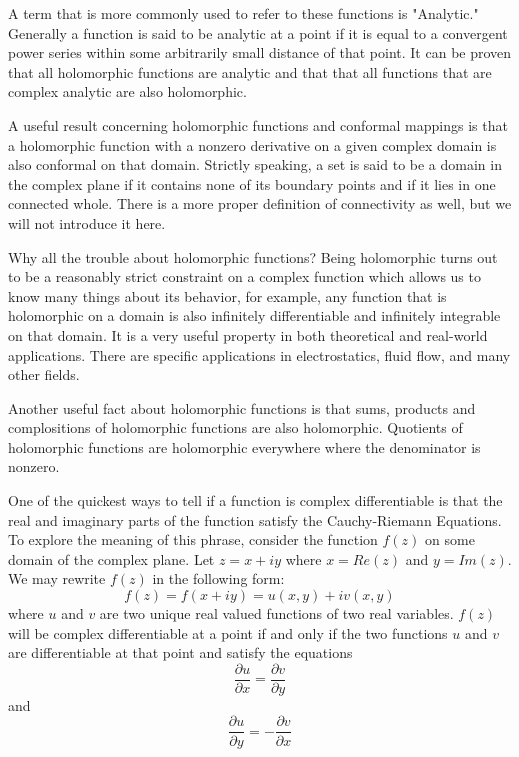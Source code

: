 A term that is more commonly used to refer to these functions is "Analytic." Generally a function is said to be analytic at a point if it is equal to a convergent power series within some arbitrarily small distance of that point. It can be proven that all holomorphic functions are analytic and that that all functions that are complex analytic are also holomorphic.

A useful result concerning holomorphic functions and conformal mappings is that a holomorphic function with a nonzero derivative on a given complex domain is also conformal on that domain. Strictly speaking, a set is said to be a domain in the complex plane if it contains none of its boundary points and if it lies in one connected whole. There is a more proper definition of connectivity as well, but we will not introduce it here.

Why all the trouble about holomorphic functions? Being holomorphic turns out to be a reasonably strict constraint on a complex function which allows us to know many things about its behavior, for example, any function that is holomorphic on a domain is also infinitely differentiable and infinitely integrable on that domain. It is a very useful property in both theoretical and real-world applications. There are specific applications in electrostatics, fluid flow, and many other fields.

Another useful fact about holomorphic functions is that sums, products and complositions of holomorphic functions are also holomorphic. Quotients of holomorphic functions are holomorphic everywhere where the denominator is nonzero.

One of the quickest ways to tell if a function is complex differentiable is that the real and imaginary parts of the function satisfy the Cauchy-Riemann Equations. To explore the meaning of this phrase, consider the function $f(z)$ on some domain of the complex plane. Let $z=x+i y$ where $x=Re(z)$ and $y=Im(z)$. We may rewrite $f(z)$ in the following form: $$f(z)=f(x+i y)=u(x,y)+i v(x,y)$$ where $u$ and $v$ are two unique real valued functions of two real variables. $f(z)$ will be complex differentiable at a point if and only if the two functions $u$ and $v$ are differentiable at that point and satisfy the equations $$\frac{\partial u}{\partial x}=\frac{\partial v}{\partial y}$$ and $$\frac{\partial u}{\partial y}=-\frac{\partial v}{\partial x}$$

